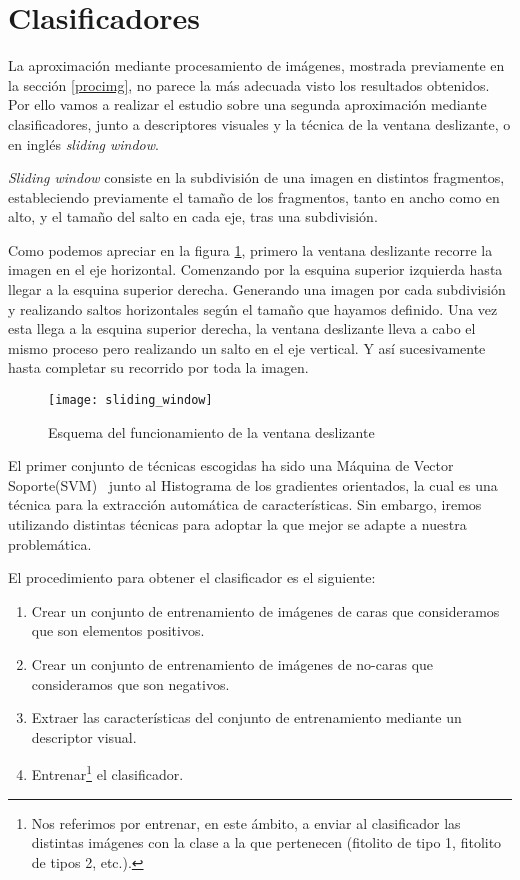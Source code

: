 \section{Clasificadores}

La aproximación mediante procesamiento de imágenes, mostrada previamente en la sección \ref{procimg}, no parece la más adecuada visto los resultados obtenidos. Por ello vamos a realizar el estudio sobre una segunda aproximación  mediante clasificadores, junto a descriptores visuales y la técnica de la ventana deslizante, o en inglés \textit{sliding window}.

\textit{Sliding window} consiste en la subdivisión de una imagen en distintos fragmentos, estableciendo previamente el tamaño de los fragmentos, tanto en ancho como en alto, y el tamaño del salto en cada eje, tras una subdivisión. 

Como podemos apreciar en la figura \ref{fig:sliding_window}, primero la ventana deslizante recorre la imagen en el eje horizontal. Comenzando por la esquina superior izquierda hasta llegar a la esquina superior derecha. Generando una imagen por cada subdivisión y realizando saltos horizontales según el tamaño que hayamos definido. Una vez esta llega a la esquina superior derecha, la ventana deslizante lleva a cabo el mismo proceso pero realizando un salto en el eje vertical. Y así sucesivamente hasta completar su recorrido por toda la imagen.

\begin{figure}
\centering
\texttt{[image: sliding\_window]}
\caption[Esquema del funcionamiento de la ventana deslizante]{Esquema del funcionamiento de la ventana deslizante~\cite{jcp}}
\label{fig:sliding_window}
\end{figure}

El primer conjunto de técnicas escogidas ha sido una Máquina de Vector Soporte(SVM)~\cite{svm} junto al Histograma de los gradientes orientados, la cual es una técnica para la extracción automática de características. Sin embargo, iremos utilizando distintas técnicas para adoptar la que mejor se adapte a nuestra problemática.

El procedimiento para obtener el clasificador es el siguiente:

\begin{enumerate}[1.]
  \item Crear un conjunto de entrenamiento de imágenes de caras que consideramos que son elementos positivos.
  \item Crear un conjunto de entrenamiento de imágenes de no-caras que consideramos que son negativos.
  \item Extraer las características del conjunto de entrenamiento  mediante un descriptor visual.
  \item Entrenar\footnote{Nos referimos por entrenar, en este ámbito, a enviar al clasificador las distintas imágenes con la clase a la que pertenecen (fitolito de tipo 1, fitolito de tipos 2, etc.).} el clasificador.
\end{enumerate}

